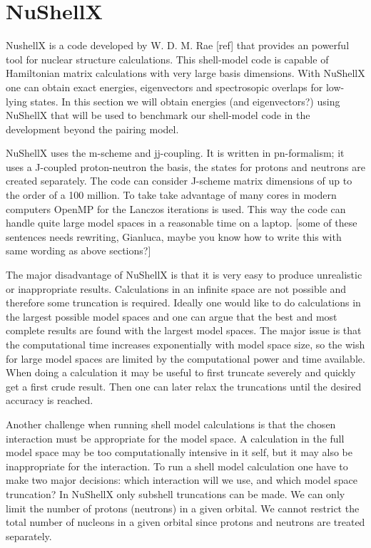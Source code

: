 \documentclass[twoside]{article}
\begin{document}
\section{NuShellX}

NushellX is a code developed by W. D. M. Rae [ref] that provides an powerful tool for nuclear structure calculations. This shell-model code is capable of Hamiltonian matrix calculations with very large basis dimensions. With NuShellX one can obtain exact energies, eigenvectors and spectrosopic overlaps for low-lying states. In this section we will obtain energies (and eigenvectors?) using NuShellX that will be used to benchmark our shell-model code in the development beyond the pairing model. 

NuShellX uses the m-scheme and jj-coupling. It is written in pn-formalism; it uses a J-coupled proton-neutron the basis, the states for protons and neutrons are created separately. The code can consider J-scheme matrix dimensions of up to the order of a 100 million. To take take advantage of many cores in modern computers OpenMP for the Lanczos iterations is used. This way the code can handle quite large model spaces in a reasonable time on a laptop.  [some of these sentences needs rewriting, Gianluca, maybe you know how to write this with same wording as above sections?]

The major disadvantage of NuShellX is that it is very easy to produce unrealistic or inappropriate results. Calculations in an infinite space are not possible and therefore some truncation is required. Ideally one would like to do calculations in the largest possible model spaces and one can argue that the best and most complete results are found with the largest model spaces. The major issue is that the computational time increases exponentially with model space size, so the wish for large model spaces are limited by the computational power and time available. When doing a calculation it may be useful to first truncate severely and quickly get a first crude result. Then one can later relax the truncations until the desired accuracy is reached. 

Another challenge when running shell model calculations is that the chosen interaction must be appropriate for the model space. A calculation in the full model space may be too computationally intensive in it self, but it may also be inappropriate for the interaction. To run a shell model calculation one have to make two major decisions: which interaction will we use, and which model space truncation? In NuShellX only subshell truncations can be made. We can only limit the number of protons (neutrons) in a given orbital. We cannot restrict the total number of nucleons in a given orbital since protons and neutrons are treated separately. 
\end{document}
